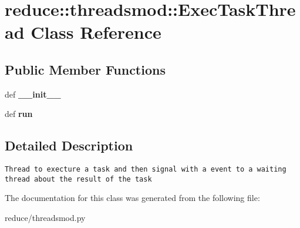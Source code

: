 \section{reduce::threadsmod::Exec\-Task\-Thread Class Reference}
\label{classreduce_1_1threadsmod_1_1ExecTaskThread}
\subsection*{Public Member Functions}
\begin{CompactItemize}
\item 
def \textbf{\_\-\_\-init\_\-\_\-}\label{classreduce_1_1threadsmod_1_1ExecTaskThread_71b2f9ac5b6de4f823e47d63d3b7944f}

\item 
def \textbf{run}\label{classreduce_1_1threadsmod_1_1ExecTaskThread_4ffffc0809453e39d4aa3942b727e649}

\end{CompactItemize}


\subsection{Detailed Description}


\footnotesize\begin{verbatim}
Thread to execture a task and then signal with a event to a waiting thread about the result of the task
\end{verbatim}
\normalsize
 



The documentation for this class was generated from the following file:\begin{CompactItemize}
\item 
reduce/threadsmod.py\end{CompactItemize}
